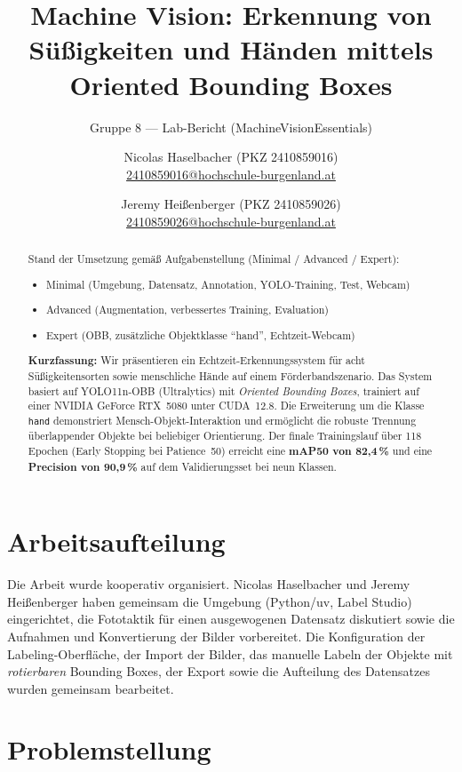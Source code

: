 \documentclass[a4paper, 11pt]{scrartcl}
\title{Machine Vision: Erkennung von Süßigkeiten und Händen mittels Oriented Bounding Boxes}
\subtitle{Gruppe 8 --- Lab-Bericht (MachineVisionEssentials)}
\author{%
Nicolas Haselbacher (PKZ 2410859016)\\
\href{mailto:2410859016@hochschule-burgenland.at}{2410859016@hochschule-burgenland.at}
\and
Jeremy Heißenberger (PKZ 2410859026)\\
\href{mailto:2410859026@hochschule-burgenland.at}{2410859026@hochschule-burgenland.at}%
}
\begin{document}
\maketitle

\begin{abstract}
\noindent
Stand der Umsetzung gemäß Aufgabenstellung (Minimal / Advanced / Expert):

\begin{itemize}
    \item[$\boxtimes$] Minimal (Umgebung, Datensatz, Annotation, YOLO-Training, Test, Webcam)
    \item[$\boxtimes$] Advanced (Augmentation, verbessertes Training, Evaluation)
    \item[$\boxtimes$] Expert (OBB, zusätzliche Objektklasse \enquote{hand}, Echtzeit-Webcam)
\end{itemize}

\vspace{0.5em}
\noindent
\textbf{Kurzfassung:}
Wir präsentieren ein Echtzeit-Erkennungssystem für acht Süßigkeitensorten sowie menschliche Hände auf einem Förderbandszenario.
Das System basiert auf YOLO11n-OBB (Ultralytics) mit \emph{Oriented Bounding Boxes}, trainiert auf einer NVIDIA GeForce RTX~5080 unter CUDA~12.8.
Die Erweiterung um die Klasse \texttt{hand} demonstriert Mensch-Objekt-Interaktion und ermöglicht die robuste Trennung überlappender Objekte bei beliebiger Orientierung.
Der finale Trainingslauf über 118 Epochen (Early Stopping bei Patience~50) erreicht eine \textbf{mAP50 von 82,4\,\%} und eine \textbf{Precision von 90,9\,\%} auf dem Validierungsset bei neun Klassen.
\end{abstract}

\section{Arbeitsaufteilung}

Die Arbeit wurde kooperativ organisiert.
Nicolas Haselbacher und Jeremy Heißenberger haben gemeinsam die Umgebung (Python/uv, Label Studio) eingerichtet, die Fototaktik für einen ausgewogenen Datensatz diskutiert sowie die Aufnahmen und Konvertierung der Bilder vorbereitet.
Die Konfiguration der Labeling-Oberfläche, der Import der Bilder, das manuelle Labeln der Objekte mit \emph{rotierbaren} Bounding Boxes, der Export sowie die Aufteilung des Datensatzes wurden gemeinsam bearbeitet.

\section{Problemstellung}
\end{document}
